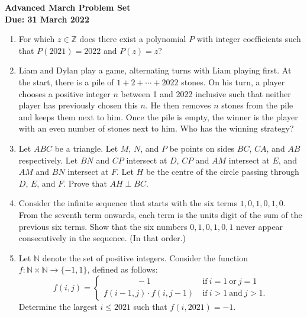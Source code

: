 \documentclass{article}
\newcommand*{\sptext}[1]{\ \text{#1}\ }
\begin{document}
\thispagestyle{empty}

\begin{center}
  \textbf{\Large Advanced March Problem Set}
  \\ \vspace{1em}
  \textbf{\large Due: 31 March 2022}
\end{center}

\smallskip

\begin{enumerate}[itemsep=\fill]

\item %
For which $z \in \mathbb{Z}$ does there exist a polynomial $P$ with integer coefficients such that $P(2021) = 2022$ and $P(z) = z$?


\item %
Liam and Dylan play a game, alternating turns with Liam playing first.
At the start, there is a pile of $1+2+\dotsb+2022$ stones.
On his turn, a player chooses a positive integer $n$ between 1 and 2022 inclusive such that neither player has previously chosen this $n$.
He then removes $n$ stones from the pile and keeps them next to him.
Once the pile is empty, the winner is the player with an even number of stones next to him.
Who has the winning strategy? 


\item %
Let $ABC$ be a triangle.
Let $M$, $N$, and $P$ be points on sides $BC$, $CA$, and $AB$ respectively.
Let $BN$ and $CP$ intersect at $D$, $CP$ and $AM$ intersect at $E$, and $AM$ and $BN$ intersect at $F$.
Let $H$ be the centre of the circle passing through $D$, $E$, and $F$.
Prove that $AH \perp BC$.


\item %
Consider the infinite sequence that starts with the six terms $1, 0, 1, 0, 1, 0$. From the seventh term onwards, each term is the units digit of the sum of the previous six terms. Show that the six numbers $0, 1, 0, 1, 0, 1$ never appear consecutively in the sequence. (In that order.)


\item %
Let $\mathbb{N}$ denote the set of positive integers. Consider the function $f: \mathbb{N} \times \mathbb{N} \to \{-1,1\}$, defined as follows: 
\[
  f(i,j) = \begin{cases}
    \mspace{72mu} -1 & \sptext{if} i=1 \sptext{or} j=1 \\
    f(i-1,j) \cdot f(i,j-1) & \sptext{if} i>1 \sptext{and} j>1.
  \end{cases}
\]
Determine the largest $i \leq 2021$ such that $f(i,2021) = -1$.



\end{enumerate}
\end{document}
